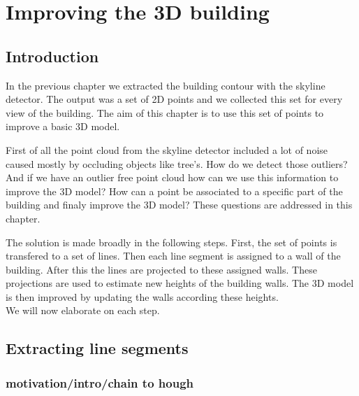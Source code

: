 \documentclass[10pt]{article}
\begin{document}
\section{Improving the 3D building}
\subsection{Introduction}
In the previous chapter we extracted the building contour with the skyline
detector. The output was a set of 2D points and we collected this set for every
view of the building.  The aim of this chapter is to use this set of points to
improve a basic 3D model.

First of all the point cloud from the skyline detector included a lot of noise caused mostly
by occluding objects like tree's. How do we detect those outliers?
And if we have an outlier free point cloud how can we use this information to
improve the 3D model? How can a point be associated to a specific part of the
building and finaly improve the 3D model? 
These questions are addressed in this chapter.

The solution is made broadly in the following steps. First, the set of points is transfered to a set of
lines. Then each line segment is assigned to a wall of the building. After this 
the lines are projected to these assigned walls. 
These projections are used to estimate new heights of the building walls.
The 3D model is then improved by updating the walls according these heights. \\
 We will now elaborate on each step.





\subsection{Extracting line segments}
\subsubsection{motivation/intro/chain to hough} %
\end{document}
